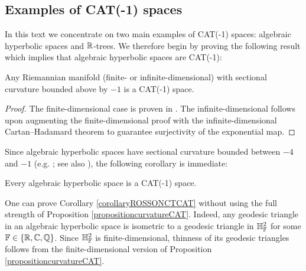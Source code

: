 \subsection{Examples of CAT(-1) spaces}
\label{subsubsectionexamplesCAT}
In this text we concentrate on two main examples of CAT(-1) spaces: algebraic hyperbolic spaces and $\R$-trees. We therefore begin by proving the following result which implies that algebraic hyperbolic spaces are CAT(-1):

\begin{proposition}
\label{propositioncurvatureCAT}
Any Riemannian manifold (finite- or infinite-dimensional) with sectional curvature bounded above by $-1$ is a CAT(-1) space.
\end{proposition}
\begin{proof}
The finite-dimensional case is proven in \cite[Theorem II.1A.6]{BridsonHaefliger}. The infinite-dimensional follows upon augmenting the finite-dimensional proof with the infinite-dimensional Cartan--Hadamard theorem \cite[IX, Theorem 3.8]{Lang_differential_geometry} to guarantee surjectivity of the exponential map.%
\end{proof}

Since algebraic hyperbolic spaces have sectional curvature bounded between $-4$ and $-1$ (e.g. \cite[Corollary of Proposition 4]{Heintze}; see also \cite[Lemmas 2.3, 2.7, and 2.11]{Quint}%
), the following corollary is immediate:

\begin{corollary}
\label{corollaryROSSONCTCAT}
Every algebraic hyperbolic space is a CAT(-1) space.
\end{corollary}

\begin{remark}
One can prove Corollary \ref{corollaryROSSONCTCAT} without using the full strength of Proposition \ref{propositioncurvatureCAT}. Indeed, any geodesic triangle in an algebraic hyperbolic space is isometric to a geodesic triangle in $\H_\F^2$ for some $\F\in\{\R,\C,\Q\}$. Since $\H_\F^2$ is finite-dimensional, thinness of its geodesic triangles follows from the finite-dimensional version of Proposition \ref{propositioncurvatureCAT}.
\end{remark}

